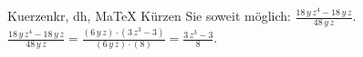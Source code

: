 \begin{MAufgabe}{Kuerzen}{kr, dh, MaTeX}
K\"urzen Sie soweit m\"oglich: $\frac{18\, y\, z^4 - 18\, y\, z}{48\, y\, z}$.\\ 
\ifLsg\MLoesung
\quad $\frac{18\, y\, z^4 - 18\, y\, z}{48\, y\, z}=\frac{(6\, y\, z)\cdot(3\, z^3 - 3)}{(6\, y\, z)\cdot(8)}=\frac{3\, z^3 - 3}{8}$.\else\relax\fi
 \end{MAufgabe}